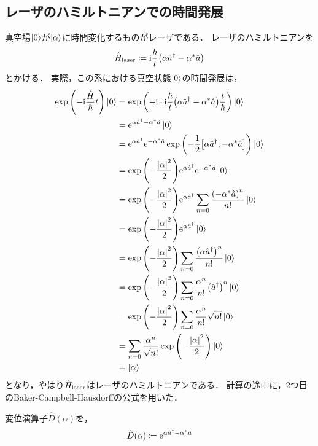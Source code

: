 \documentclass{report}
\begin{document}
  \subsection{レーザのハミルトニアンでの時間発展}
    真空場$\ket{0}$が$\ket{\alpha}$に時間変化するものがレーザである．
    レーザのハミルトニアンを
    \begin{align}
      \hat{H}_{\mathrm{laser}} \coloneqq \mathrm{i}\frac{\hbar}{t}\qty(\alpha\hat{a}^{\dag} - \alpha^*\hat{a})
    \end{align}
    とかける．
    実際，この系における真空状態$\ket{0}$の時間発展は，
    \begin{align}
      \exp\qty(-\mathrm{i}\frac{\hat{H}}{\hbar}t)\ket{0} &= \exp\qty(-\mathrm{i}\cdot\mathrm{i}\frac{\hbar}{t}\qty(\alpha\hat{a}^{\dag} - \alpha^*\hat{a})\frac{t}{\hbar})\ket{0} \\ 
      &= \mathrm{e}^{\alpha\hat{a}^{\dag} - \alpha^*\hat{a}}\ket{0} \\ 
      &= \mathrm{e}^{\alpha\hat{a}^{\dag}}\mathrm{e}^{-\alpha^*\hat{a}}\exp\qty(-\frac{1}{2}\qty[\alpha\hat{a}^{\dag}, -\alpha^*\hat{a}])\ket{0} \\ 
      &= \exp\qty(-\frac{\abs{\alpha}^2}{2})\mathrm{e}^{\alpha\hat{a}^{\dag}}\mathrm{e}^{-\alpha^*\hat{a}}\ket{0} \\ 
      &= \exp\qty(-\frac{\abs{\alpha}^2}{2})\mathrm{e}^{\alpha\hat{a}^{\dag}}\sum_{n = 0}\frac{\qty(-\alpha^*\hat{a})^n}{n!}\ket{0} \\ 
      &= \exp\qty(-\frac{\abs{\alpha}^2}{2})\mathrm{e}^{\alpha\hat{a}^{\dag}}\ket{0} \\ 
      &= \exp\qty(-\frac{\abs{\alpha}^2}{2})\sum_{n = 0}\frac{\qty(\alpha\hat{a}^{\dag})^n}{n!}\ket{0} \\ 
      &= \exp\qty(-\frac{\abs{\alpha}^2}{2})\sum_{n = 0}\frac{\alpha^n}{n!}\qty(\hat{a}^{\dag})^n\ket{0} \\ 
      &= \exp\qty(-\frac{\abs{\alpha}^2}{2})\sum_{n = 0}\frac{\alpha^n}{n!}\sqrt{n!}\ket{0} \\ 
      &= \sum_{n = 0}\frac{\alpha^n}{\sqrt{n!}}\exp\qty(-\frac{\abs{\alpha}^2}{2})\ket{0} \\ 
      &= \ket{\alpha}
    \end{align}
    となり，やはり$\hat{H}_{\mathrm{laser}}$はレーザのハミルトニアンである．
    計算の途中に，2つ目のBaker-Campbell-Hausdorffの公式を用いた．
    \par
    変位演算子$\hat{D}(\alpha)$を，
    \begin{align}
      \hat{D}(\alpha) \coloneqq \mathrm{e}^{\alpha\hat{a}^{\dag} - \alpha^*\hat{a}}
    \end{align}
\end{document}
